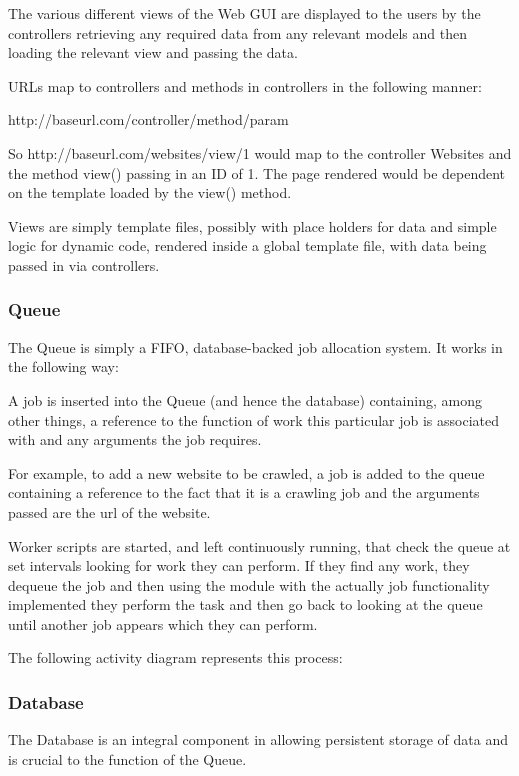 \documentclass[12pt,a4paper]{article}
\begin{document}
The various different views of the Web GUI are displayed to the users by the controllers retrieving any required data from any relevant models and then loading the relevant view and passing the data.

URLs map to controllers and methods in controllers in the following manner:

http://baseurl.com/controller/method/param

So http://baseurl.com/websites/view/1 would map to the controller Websites and the method view() passing in an ID of 1.  The page rendered would be dependent on the template loaded by the view() method.

Views are simply template files, possibly with place holders for data and simple logic for dynamic code, rendered inside a global template file, with data being passed in via controllers.

\subsubsection{Queue}
The Queue is simply a FIFO, database-backed job allocation system.  It works in the following way:

A job is inserted into the Queue (and hence the database) containing, among other things, a reference to the function of work this particular job is associated with and any arguments the job requires.

For example, to add a new website to be crawled, a job is added to the queue containing a reference to the fact that it is a crawling job and the arguments passed are the url of the website.

Worker scripts are started, and left continuously running, that check the queue at set intervals looking for work they can perform.  If they find any work, they dequeue the job and then using the module with the actually job functionality implemented they perform the task and then go back to looking at the queue until another job appears which they can perform.

The following activity diagram represents this process:


\subsubsection{Database}
The Database is an integral component in allowing persistent storage of data and is crucial to the function of the Queue. 
\end{document}
